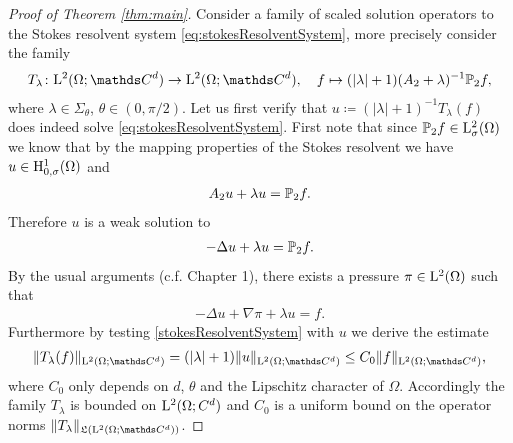 \begin{proof}[Proof of Theorem \ref{thm:main}]
  Consider a family of scaled solution operators to the Stokes resolvent system \eqref{eq:stokesResolventSystem}, more precisely consider the family
  \begin{align*}
    T_\lambda \colon \Ell^2(\Omega; \C^d) \to \Ell^2(\Omega; \C^d), \quad f \mapsto (|\lambda| + 1) (A_2 + \lambda)^{-1} \PP_2 f,
  \end{align*}
  where $\lambda \in \Sigma_\theta$, $\theta \in (0, \pi/2)$.
  Let us first verify that $u \coloneqq (|\lambda| + 1)^{-1} T_\lambda(f)$ does indeed solve \eqref{eq:stokesResolventSystem}.
  First note that since $\mathbb{P}_2 f \in \mathrm{L}^2_\sigma(\Omega)$ we know that by the mapping properties of the Stokes resolvent we have $u \in \mathrm{H}^1_{0,\sigma}(\Omega)$ and
  \begin{align*}
    A_2 u + \lambda u = \mathbb{P}_2 f.
  \end{align*}
  Therefore $u$ is a weak solution to 
  \begin{align*}
    -\Delta u + \lambda u = \mathbb{P}_2 f.
  \end{align*}
  By the usual arguments (c.f. Chapter 1), there exists a pressure $\pi \in \mathrm{L}^2(\Omega)$ such that 
  \begin{align*}
    -\Delta u + \nabla \pi + \lambda u = f.
  \end{align*}
  Furthermore by testing \eqref{stokesResolventSystem} with $u$ we derive the estimate
  \begin{align*}
    \| T_\lambda(f) \|_{\Ell^2(\Omega; \C^d)} = (|\lambda| + 1) \|u\|_{\Ell^2(\Omega; \C^d)}
    \leq C_0 \|f\|_{\Ell^2(\Omega; \C^d)},
  \end{align*}
  where $C_0$ only depends on $d$, $\theta$ and the Lipschitz character of $\Omega$.
  Accordingly the family $T_\lambda$ is bounded on $\mathrm{L}^2(\Omega; C^d)$ and $C_0$ is a uniform bound on the operator norms $\|T_\lambda\|_{\Li(\Ell^2(\Omega; \C^d))}$.


\end{proof}
